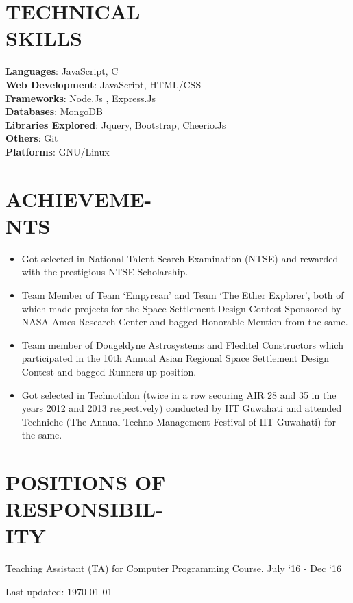 \documentclass[margin]{res}
\begin{document}
\begin{resume}
\section{TECHNICAL \\ SKILLS}
  {\textbf{Languages}:} JavaScript, C\\
	{\textbf{Web Development}:} JavaScript, HTML/CSS\\
  {\textbf{Frameworks}:} Node.Js , Express.Js\\
  {\textbf{Databases}:} MongoDB\\
  {\textbf{Libraries Explored}:} Jquery, Bootstrap, Cheerio.Js\\
  {\textbf{Others}:} Git\\
  {\textbf{Platforms}:} GNU/Linux

  \section{ACHIEVEME-\\NTS}
  \begin{itemize}  \itemsep -2pt %
      \item Got selected in National Talent Search Examination (NTSE) and rewarded with the prestigious NTSE Scholarship.
      \item Team Member of Team ‘Empyrean’ and Team ‘The Ether Explorer’, both of which made projects for the Space Settlement Design Contest Sponsored by NASA Ames Research Center and bagged Honorable Mention from the same.
      \item Team member of Dougeldyne Astrosystems and Flechtel Constructors which participated in the 10th Annual Asian Regional Space Settlement Design\\ Contest and bagged Runners-up position.
      \item Got selected in Technothlon (twice in a row securing AIR 28 and 35 in the years 2012 and 2013 respectively) conducted by IIT Guwahati and attended Techniche (The Annual Techno-Management Festival of IIT Guwahati) for the same.
  \end{itemize}

\section{POSITIONS OF\\ RESPONSIBIL-\\ITY}
    Teaching Assistant (TA) for Computer Programming Course. \hfill July `16 - Dec `16\\

\begin{center}
  \begin{footnotesize}
    Last updated: \today \\
  \end{footnotesize}
\end{center}

\end{resume}
\end{document}
